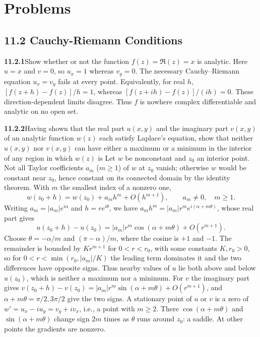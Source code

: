 
\section*{Problems}

\subsection*{11.2 Cauchy-Riemann Conditions}

\par\bigskip
\noindent\textbf{11.2.1}\quad Show whether or not the function
$f(z)=\Re(z)=x$ is analytic.
\solution
Here $u=x$ and $v=0$, so $u_x=1$ whereas $v_y=0$.
The necessary Cauchy--Riemann equation $u_x=v_y$ fails at every point.
Equivalently, for real $h$, $[f(z+h)-f(z)]/h=1$, whereas
$[f(z+ih)-f(z)]/(ih)=0$. These direction-dependent limits disagree.
Thus $f$ is nowhere complex differentiable and analytic on no open set.

\par\bigskip
\noindent\textbf{11.2.2}\quad Having shown that the real part $u(x,y)$ and
the imaginary part $v(x,y)$ of an analytic function $w(z)$ each satisfy
Laplace's equation, show that neither $u(x,y)$ nor $v(x,y)$ can have either a
maximum or a minimum in the interior of any region in which $w(z)$ is
\solution
{}
Let $w$ be nonconstant and $z_0$ an interior point. Not all Taylor
coefficients $a_m$ ($m\ge1$) of $w$ at $z_0$ vanish; otherwise $w$ would be
constant near $z_0$, hence constant on its connected domain by the
identity theorem. With $m$ the smallest index of a nonzero one,
\[
w(z_0+h)=w(z_0)+a_mh^m+O(h^{m+1}),\qquad a_m\ne0,\quad m\ge1.
\]
Writing $a_m=|a_m|e^{i\alpha}$ and $h=re^{i\theta}$, we have
$a_mh^m=|a_m|r^me^{i(\alpha+m\theta)}$, whose real part gives
\[
u(z_0+h)-u(z_0)
=|a_m|r^m\cos(\alpha+m\theta)+O(r^{m+1}).
\]
Choose $\theta=-\alpha/m$ and $(\pi-\alpha)/m$, where the cosine is
$+1$ and $-1$. The remainder is bounded by $Kr^{m+1}$ for $0<r<r_0$, with
some constants $K,r_0>0$, so for $0<r<\min(r_0,|a_m|/K)$ the leading term
dominates it and the two differences have opposite signs. Thus nearby
values of $u$ lie both above and below
$u(z_0)$, which is neither a maximum nor a minimum.
For $v$ the imaginary part gives
$v(z_0+h)-v(z_0)=|a_m|r^m\sin(\alpha+m\theta)+O(r^{m+1})$, and
$\alpha+m\theta=\pi/2,3\pi/2$ give the two signs.
A stationary point of $u$ or $v$ is a zero of
$w'=u_x-iu_y=v_y+iv_x$, i.e., a point with $m\ge2$. There
$\cos(\alpha+m\theta)$ and $\sin(\alpha+m\theta)$ change sign $2m$
times as $\theta$ runs around $z_0$: a saddle. At other points the
gradients are nonzero.

